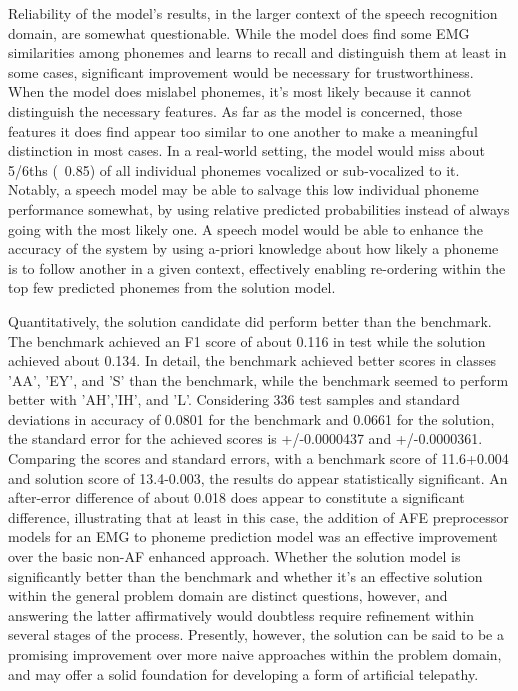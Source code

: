 \documentclass[conference]{IEEEtran}
\begin{document}
Reliability of the model's results, in the larger context of the speech recognition domain, are somewhat questionable. While the model does find some EMG similarities among phonemes and learns to recall and distinguish them at least in some cases, significant improvement would be necessary for trustworthiness. When the model does mislabel phonemes, it's most likely because it cannot distinguish the necessary features. As far as the model is concerned, those features it does find appear too similar to one another to make a meaningful distinction in most cases. In a real-world setting, the model would miss about 5/6ths (~0.85) of all individual phonemes vocalized or sub-vocalized to it. Notably, a speech model may be able to salvage this low individual phoneme performance somewhat, by using relative predicted probabilities instead of always going with the most likely one. A speech model would be able to enhance the accuracy of the system by using a-priori knowledge about how likely a phoneme is to follow another in a given context, effectively enabling re-ordering within the top few predicted phonemes from the solution model.

Quantitatively, the solution candidate did perform better than the benchmark. The benchmark achieved an F1 score of about 0.116 in test while the solution achieved about 0.134. In detail, the benchmark achieved better scores in classes 'AA', 'EY', and 'S' than the benchmark, while the benchmark seemed to perform better with 'AH','IH', and 'L'. Considering 336 test samples and standard deviations in accuracy of 0.0801 for the benchmark and 0.0661 for the solution, the standard error for the achieved scores is +/-0.0000437 and +/-0.0000361. Comparing the scores and standard errors, with a benchmark score of 11.6+0.004 and solution score of 13.4-0.003, the results do appear statistically significant. An after-error difference of about 0.018 does appear to constitute a significant difference, illustrating that at least in this case, the addition of AFE preprocessor models for an EMG to phoneme prediction model was an effective improvement over the basic non-AF enhanced approach. Whether the solution model is significantly better than the benchmark and whether it's an effective solution within the general problem domain are distinct questions, however, and answering the latter affirmatively would doubtless require refinement within several stages of the process. Presently, however, the solution can be said to be a promising improvement over more naive approaches within the problem domain, and may offer a solid foundation for developing a form of artificial telepathy.
\end{document}
